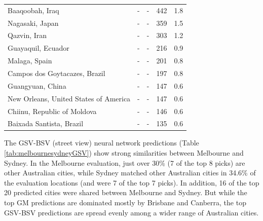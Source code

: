 \documentclass[10pt,letterpaper]{article}
\begin{document}
\begin{table}[!htbp]
\begin{adjustwidth}{-2.25in}{0in}
\begin{tabular}{ l  l l l  l}
Baaqoobah, Iraq &-&- & 442 & 1.8\\ 
Nagasaki, Japan &-&- & 359 & 1.5\\ 
Qazvin, Iran &-&- & 303 & 1.2\\ 
Guayaquil, Ecuador &-&- & 216 & 0.9\\ 
Malaga, Spain &-&- & 201 & 0.8\\ 
Campos dos Goytacazes, Brazil &-&- & 197 & 0.8\\ 
Guangyuan, China &-&- & 147 & 0.6\\ 
New Orleans, United States of America &-&- & 147 & 0.6\\ 
Chiinu, Republic of Moldova &-&- & 146 & 0.6\\ 
Baixada Santista, Brazil &-&- & 135 & 0.6\\ \hline
\end{tabular}
\end{adjustwidth}
\end{table}


The GSV-BSV (street view) neural network predictions (Table \ref{tab:melbournesydneyGSV}) show strong similarities between Melbourne and Sydney. In the Melbourne evaluation, just over 30\% (7 of the top 8 picks) are other Australian cities, while Sydney matched other Australian cities in 34.6\% of the evaluation locations (and were 7 of the top 7 picks). In addition, 16 of the top 20 predicted cities were shared between Melbourne and Sydney. But while the top GM predictions are dominated mostly by Brisbane and Canberra, the top GSV-BSV predictions are spread evenly among a wider range of Australian cities.
\end{document}
